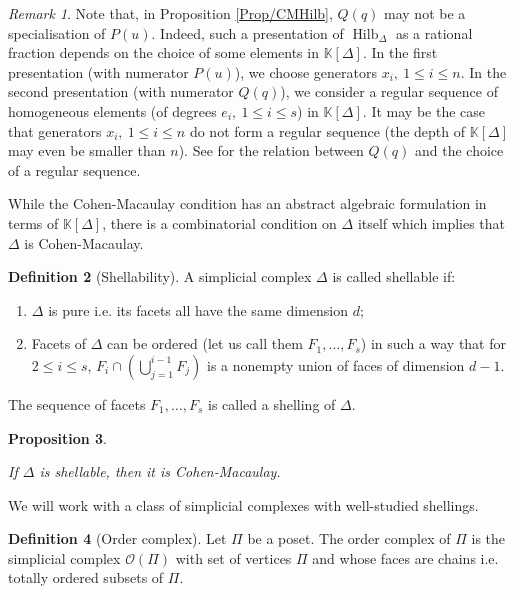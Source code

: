 \documentclass[11pt,english]{article}
\numberwithin{equation}{section}
\numberwithin{figure}{section}
\theoremstyle{definition}
\newtheorem{df}{Definition}[subsection]
\theoremstyle{plain}
\newtheorem{prop}[df]{Proposition}
\theoremstyle{remark}
\newtheorem{rmk}[df]{Remark}
\DeclareMathOperator{\Hilb}{Hilb}
\newcommand\KK{\mathbb{K}}
\begin{document}
\begin{rmk}

Note that, in Proposition \ref{Prop/CMHilb}, $Q(q)$ may not be a
specialisation of $P(u)$. Indeed, such a presentation of $\Hilb_{\Delta}$
as a rational fraction depends on the choice of some elements in $\KK[\Delta]$.
In the first presentation (with numerator $P(u)$), we choose generators
$x_{i},\ 1\leq i\leq n$. In the second presentation (with numerator
$Q(q)$), we consider a regular sequence of homogeneous elements (of
degrees $e_{i},\ 1\leq i\leq s$) in $\KK[\Delta]$. It may be the
case that generators $x_{i},\ 1\leq i\leq n$ do not form a regular
sequence (the depth of $\KK[\Delta]$ may even be smaller than $n$).
See \cite[Ch. I, \S5]{Sta07} for the relation between $Q(q)$ and
the choice of a regular sequence.

\end{rmk}

While the Cohen-Macaulay condition has an abstract algebraic formulation
in terms of $\KK[\Delta]$, there is a combinatorial condition on
$\Delta$ itself which implies that $\Delta$ is Cohen-Macaulay.

\begin{df}[Shellability]

A simplicial complex $\Delta$ is called shellable if:
\begin{enumerate}
\item $\Delta$ is pure i.e. its facets all have the same dimension $d$;
\item Facets of $\Delta$ can be ordered (let us call them $F_{1},\ldots,F_{s}$)
in such a way that for $2\leq i\leq s$, $F_{i}\cap\left(\bigcup_{j=1}^{i-1}F_{j}\right)$
is a nonempty union of faces of dimension $d-1$.
\end{enumerate}
The sequence of facets $F_{1},\ldots,F_{s}$ is called a shelling
of $\Delta$.

\end{df}

\begin{prop}{\cite[Ch. III, Thm. 2.5.]{Sta07}} \label{Prop/ShellCM}

If $\Delta$ is shellable, then it is Cohen-Macaulay.

\end{prop}

We will work with a class of simplicial complexes with well-studied
shellings.

\begin{df}[Order complex]

Let $\Pi$ be a poset. The order complex of $\Pi$ is the simplicial
complex $\mathcal{O}(\Pi)$ with set of vertices $\Pi$ and whose
faces are chains i.e. totally ordered subsets of $\Pi$.

\end{df}
\end{document}
